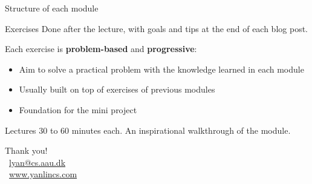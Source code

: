 \documentclass[aspectratio=169]{beamer}
\begin{document}
\begin{frame}{Structure of each module}
  \begin{block}{Exercises}
    Done after the lecture, with goals and tips at the end of each blog post.

    \vspace{.5em}
    Each exercise is \textbf{problem-based} and \textbf{progressive}:
    \begin{itemize}
      \item Aim to solve a practical problem with the knowledge learned in each module
      \item Usually built on top of exercises of previous modules
      \item Foundation for the mini project
    \end{itemize}
  \end{block}

  \begin{block}{Lectures}
    30 to 60 minutes each. An inspirational walkthrough of the module.
  \end{block}
\note{
}
\end{frame}



\appendix

\begin{frame}
\begin{center}
{\large Thank you!}
\vspace{1cm}
\\[0.5em]
{\small \faEnvelope\ \href{mailto:lyan@cs.aau.dk}{lyan@cs.aau.dk} \\
\faGlobe\ \href{https://www.yanlincs.com}{www.yanlincs.com}}
\end{center}
\note{
}
\end{frame}
\end{document}
